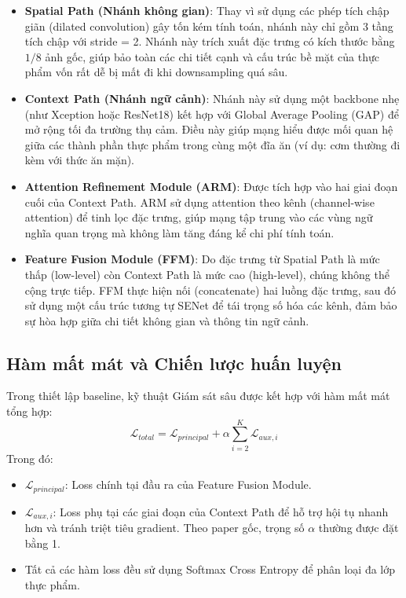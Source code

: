 \begin{itemize}[leftmargin=1.5em]
    \item \textbf{Spatial Path (Nhánh không gian)}: Thay vì sử dụng các phép tích chập giãn (dilated convolution) gây tốn kém tính toán, nhánh này chỉ gồm 3 tầng tích chập với stride = 2. Nhánh này trích xuất đặc trưng có kích thước bằng $1/8$ ảnh gốc, giúp bảo toàn các chi tiết cạnh và cấu trúc bề mặt của thực phẩm vốn rất dễ bị mất đi khi downsampling quá sâu.
    \item \textbf{Context Path (Nhánh ngữ cảnh)}: Nhánh này sử dụng một backbone nhẹ (như Xception hoặc ResNet18) kết hợp với Global Average Pooling (GAP) để mở rộng tối đa trường thụ cảm. Điều này giúp mạng hiểu được mối quan hệ giữa các thành phần thực phẩm trong cùng một đĩa ăn (ví dụ: cơm thường đi kèm với thức ăn mặn).
    \item \textbf{Attention Refinement Module (ARM)}: Được tích hợp vào hai giai đoạn cuối của Context Path. ARM sử dụng attention theo kênh (channel-wise attention) để tinh lọc đặc trưng, giúp mạng tập trung vào các vùng ngữ nghĩa quan trọng mà không làm tăng đáng kể chi phí tính toán.
    \item \textbf{Feature Fusion Module (FFM)}: Do đặc trưng từ Spatial Path là mức thấp (low-level) còn Context Path là mức cao (high-level), chúng không thể cộng trực tiếp. FFM thực hiện nối (concatenate) hai luồng đặc trưng, sau đó sử dụng một cấu trúc tương tự SENet để tái trọng số hóa các kênh, đảm bảo sự hòa hợp giữa chi tiết không gian và thông tin ngữ cảnh.
\end{itemize}

\subsection{Hàm mất mát và Chiến lược huấn luyện}
Trong thiết lập baseline, kỹ thuật Giám sát sâu được kết hợp với hàm mất mát tổng hợp:
\[
\mathcal{L}_{total} = \mathcal{L}_{principal} + \alpha \sum_{i=2}^{K} \mathcal{L}_{aux,i}
\]
Trong đó:
\begin{itemize}[leftmargin=1.5em]
    \item $\mathcal{L}_{principal}$: Loss chính tại đầu ra của Feature Fusion Module.
    \item $\mathcal{L}_{aux,i}$: Loss phụ tại các giai đoạn của Context Path để hỗ trợ hội tụ nhanh hơn và tránh triệt tiêu gradient. Theo paper gốc, trọng số $\alpha$ thường được đặt bằng 1.
    \item Tất cả các hàm loss đều sử dụng Softmax Cross Entropy để phân loại đa lớp thực phẩm.
\end{itemize}

